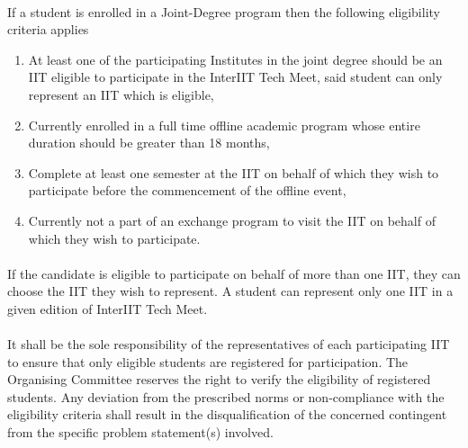 \paragraph{}
If a student is enrolled in a Joint-Degree program then the following eligibility criteria applies
\begin{enumerate}
    \item At least one of the participating Institutes in the joint degree should be an IIT eligible to participate in the InterIIT Tech Meet, said student can only represent an IIT which is eligible,
    \item Currently enrolled in a full time offline academic program whose entire duration should be greater than 18 months,
    \item Complete at least one semester at the IIT on behalf of which they wish to participate before the commencement of the offline event,
    \item Currently not a part of an exchange program to visit the IIT on behalf of which they wish to participate.
\end{enumerate}

\paragraph{}
If the candidate is eligible to participate on behalf of more than one IIT, they can choose the IIT they wish to represent. A student can represent only one IIT in a given edition of InterIIT Tech Meet. 

\paragraph{}
It shall be the sole responsibility of the representatives of each participating IIT to ensure that only eligible students are registered for participation. The Organising Committee reserves the right to verify the eligibility of registered students. Any deviation from the prescribed norms or non-compliance with the eligibility criteria shall result in the disqualification of the concerned contingent from the specific problem statement(s) involved.